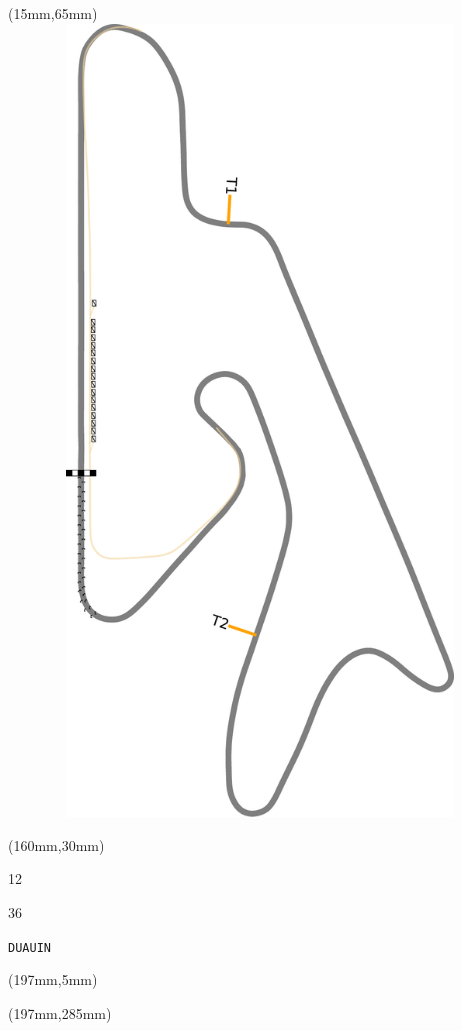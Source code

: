 \begin{textblock*}{185mm}(15mm,65mm)%
\centering
\mbox{\includegraphics[width=185mm,height=210mm,keepaspectratio]{PT/DUAUIN.pdf}}
\end{textblock*}
\begin{textblock*}{40mm}(160mm,30mm)%
\Large
\par{} 
\par12 
\par36 
\par\hfill\tiny\tt DUAUIN\\
\end{textblock*}
\begin{textblock*}{20mm}(197mm,5mm)%
\fbox{\thepage}
\label{DUAUIN}
\end{textblock*}
\begin{textblock*}{20mm}(197mm,285mm)%
\fbox{\thepage}
\end{textblock*}

